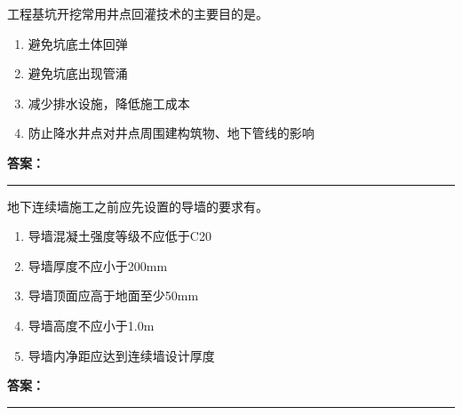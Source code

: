\documentclass[UTF8,fontset=fandol,11pt]{ctexart}
\newcommand{\answerline}{\textcolor{answerred}{\rule{2.4cm}{0.7pt}}}
\begin{document}
\begin{quizbox}[title={乱序第 21 题｜第三章基坑工程}]

工程基坑开挖常用井点回灌技术的主要目的是。\\

\begin{enumerate}[label=\Alph*.]

\item 避免坑底土体回弹

\item 避免坑底出现管涌

\item 减少排水设施，降低施工成本

\item 防止降水井点对井点周围建构筑物、地下管线的影响

\end{enumerate}

\textbf{\textcolor{answerred}{答案：}} \answerline

\end{quizbox}

\vspace{0.2em}

\begin{quizbox}[title={乱序第 22 题｜第三章基坑工程}]

地下连续墙施工之前应先设置的导墙的要求有。\\

\begin{enumerate}[label=\Alph*.]

\item 导墙混凝土强度等级不应低于C20

\item 导墙厚度不应小于200mm

\item 导墙顶面应高于地面至少50mm

\item 导墙高度不应小于1.0m

\item 导墙内净距应达到连续墙设计厚度

\end{enumerate}

\textbf{\textcolor{answerred}{答案：}} \answerline

\end{quizbox}

\vspace{0.2em}
\end{document}
